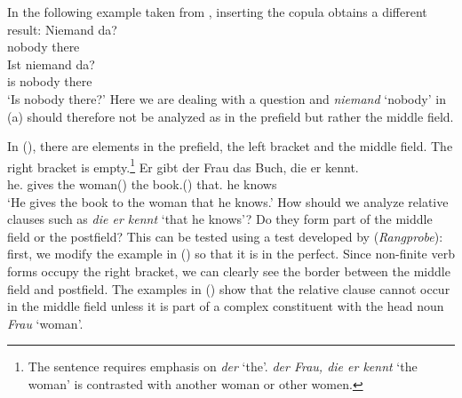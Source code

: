 In the following example taken from \citet[]{Paul1919a}, inserting the copula obtains a different result: 
\eal
\ex 
\gll Niemand da?\\
	 nobody there\\
\ex 
\gll Ist niemand da?\\
	 is nobody there\\
\glt `Is nobody there?'
\zl
Here we are dealing with a question and \emph{niemand} `nobody' in (a) should therefore not be analyzed as in the prefield but rather the middle field.

In (), there are elements in the prefield, the left bracket and the middle field. The right
bracket is empty.\footnote{
  The sentence requires emphasis on \emph{der} `the'. \emph{der Frau, die er kennt} `the woman' is
  contrasted with another woman or other women.
}
\ea
\gll Er        gibt  der Frau        das Buch,       die er kennt.\\
     he.\mas{} gives the woman(\fem) the book.(\neu) that.\fem{} he knows\\
\glt `He gives the book to the woman that he knows.'
\z 
How should we analyze relative clauses such as
\emph{die er kennt} `that he knows'? Do they form part of the middle field or the postfield?
This can be tested using a test developed by \citet[]{Bech55a} (\emph{Rangprobe}):
first, we modify the example in () so that it is in the perfect. Since non-finite verb forms occupy the right bracket, we
can clearly see the border between the middle field and postfield. The examples in () show that the relative clause cannot
occur in the middle field unless it is part of a complex constituent with the head noun \emph{Frau} `woman'.
\eal
{}
\zl

